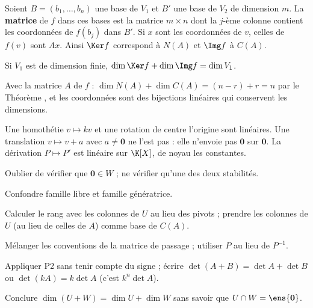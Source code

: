 \begin{definition}
Soient $B=(b_1,\dots,b_n)$ une base de $V_1$ et $B'$ une base de $V_2$ de dimension $m$. La \textbf{matrice} de $f$ dans ces bases est la matrice $m\times n$ dont la $j$-ème colonne contient les coordonnées de $f(b_j)$ dans $B'$. Si $x$ sont les coordonnées de $v$, celles de $f(v)$ sont $Ax$. Ainsi $\Ker f$ correspond à $N(A)$ et $\Img f$ à $C(A)$.
\end{definition}
\begin{theoreme}\label{thm-rang}
Si $V_1$ est de dimension finie, $\dim\Ker f+\dim\Img f=\dim V_1$.
\end{theoreme}
\begin{preuve}
Avec la matrice $A$ de $f$ : $\dim N(A)+\dim C(A)=(n-r)+r=n$ par le Théorème , et les coordonnées sont des bijections linéaires qui conservent les dimensions.
\end{preuve}
\begin{exemple}
Une homothétie $v\mapsto kv$ et une rotation de centre l'origine sont linéaires. Une translation $v\mapsto v+a$ avec $a\neq\mathbf 0$ ne l'est pas : elle n'envoie pas $\mathbf 0$ sur $\mathbf 0$. La dérivation $P\mapsto P'$ est linéaire sur $\K[X]$, de noyau les constantes.
\end{exemple}

\begin{erreurs}
\item Oublier de vérifier que $\mathbf 0\in W$ ; ne vérifier qu'une des deux stabilités.
\item Confondre famille libre et famille génératrice.
\item Calculer le rang avec les colonnes de $U$ au lieu des pivots ; prendre les colonnes de $U$ (au lieu de celles de $A$) comme base de $C(A)$.
\item Mélanger les conventions de la matrice de passage ; utiliser $P$ au lieu de $P^{-1}$.
\item Appliquer P2 sans tenir compte du signe ; écrire $\det(A+B)=\det A+\det B$ ou $\det(kA)=k\det A$ (c'est $k^n\det A$).
\item Conclure $\dim(U+W)=\dim U+\dim W$ sans savoir que $U\cap W=\ens{\mathbf 0}$.
\end{erreurs}

\exercices


